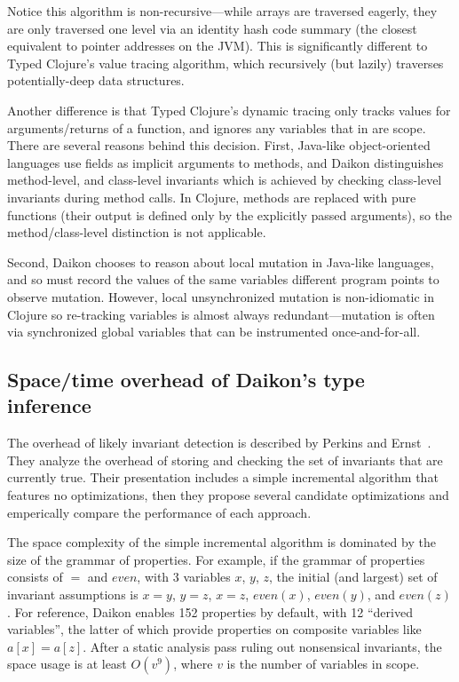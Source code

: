 Notice this algorithm is non-recursive---while arrays are traversed eagerly, they
are only traversed one level via an identity hash code summary (the closest equivalent to
pointer addresses on the JVM).
This is significantly different to Typed Clojure's value tracing algorithm,
which recursively (but lazily) traverses potentially-deep data structures.

Another difference is that Typed Clojure's dynamic tracing only tracks
values for arguments/returns of a function, and ignores any variables
that in are scope. There are several reasons behind this decision.
First, Java-like object-oriented languages use fields as implicit
arguments to methods, and Daikon distinguishes method-level, and class-level
invariants which is achieved by checking class-level invariants during
method calls.
In Clojure, methods are replaced with pure functions (their output is defined only by the
explicitly passed arguments), so the method/class-level distinction is
not applicable.

Second, Daikon chooses to reason about local mutation in Java-like languages,
and so must record the values of the same variables different program points
to observe mutation. However, local unsynchronized mutation is non-idiomatic
in Clojure so re-tracking variables is almost always redundant---mutation is
often via synchronized global variables that can be instrumented once-and-for-all.

\subsection{Space/time overhead of Daikon's type inference}

The overhead of likely invariant detection
is described by Perkins and Ernst~\cite{Perkins04efficientincremental}.
They analyze the overhead of storing and checking the set of
invariants that are currently true.
Their presentation includes a simple incremental algorithm that
features no optimizations, then they propose several candidate
optimizations and emperically compare the performance of each
approach.

The space complexity of the simple incremental algorithm is dominated 
by the size of the grammar of properties. For example, if the grammar
of properties consists of $=$ and $even$, with
3 variables $x$, $y$, $z$, the initial (and largest) set of invariant assumptions
is $x = y$, $y = z$, $x = z$, $even(x)$, $even(y)$, and $even(z)$.
For reference, Daikon enables 152 properties by default, with
12 ``derived variables'', the latter of which provide properties on composite variables
like $a[x] = a[z]$. After a static analysis pass ruling out nonsensical invariants,
the space usage is at least $O(v^9)$, where $v$ is the number of variables in scope.

